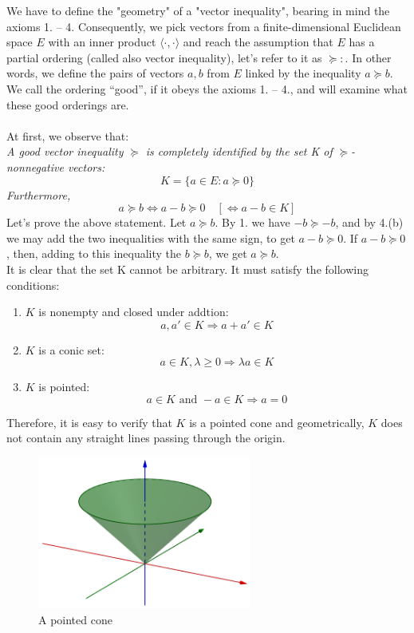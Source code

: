 \documentclass[12pt]{article}
\begin{document}
We have to define the "geometry" of a "vector inequality", bearing in mind the  axioms 1. – 4. Consequently, we pick vectors from a finite-dimensional Euclidean space $E$ with an inner product $ \langle \cdot, \cdot \rangle$ and reach the assumption that $E$ has a partial ordering (called also vector inequality), let's refer to it as $\succeq:$. In other words, we define the pairs of vectors $a, b$ from $E$ linked by the inequality $a \succeq b$. We call the ordering “good”, if it obeys the axioms 1. – 4., and will examine what these good orderings are. \\  \\
At first, we observe that: \\ 
\textit{A good vector inequality $\succeq$ is completely identified by the set \emph{K} of $\succeq$-nonnegative vectors:}
$$K = \{ a \in E: a \succeq 0 \}$$ 
\textit{Furthermore,}
$$ a \succeq b \Leftrightarrow a - b \succeq 0 \quad [\Leftrightarrow a - b \in K]$$
Let's prove the above statement. Let $a \succeq b$. By 1. we have $-b \succeq -b$, and by 4.(b) we may add the two inequalities with the same sign, to get $a - b \succeq 0$. If $a - b \succeq 0$, then, adding to this inequality the $b \succeq b$, we get $a \succeq b$. \\
It is clear that the set K cannot be arbitrary. It must satisfy the following conditions:
\begin{enumerate}
\item $K$ is nonempty and closed under addtion: $$a,a' \in K \Rightarrow a+a' \in K$$
\item $K$ is a conic set: $$a \in K, \lambda  \geq 0 \Rightarrow \lambda a \in K$$
\item $K$ is pointed: $$ a \in K \text{ and } -a \in K \Rightarrow a = 0$$
\end{enumerate} \newpage 
Therefore, it is easy to verify that $K$ is a pointed cone and geometrically, $K$ does not contain any straight lines passing through the origin.
\begin{figure}[h!]
	\begin{center}
  		\includegraphics[width=7cm]{pointed_cone.png}
  		\caption{A pointed cone}
	  \end{center}
\end{figure}
\end{document}
